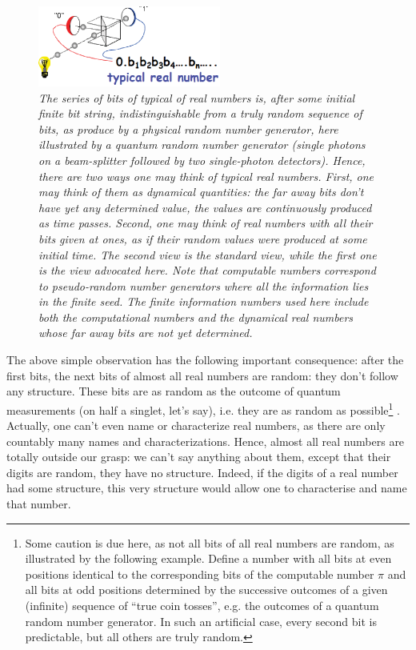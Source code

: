 \documentclass[pra,aps,groupedaddress,twocolumn,floatfix,nofootinbib]{revtex4}
\begin{document}
\begin{figure}[h]
\includegraphics[width=6cm]{TypicalRealNumber.eps}
\caption{\it The series of bits of typical of real numbers is, after some initial finite bit string, indistinguishable from a truly random sequence of bits, as produce by a physical random number generator, here illustrated by a quantum random number generator (single photons on a beam-splitter followed by two single-photon detectors). Hence, there are two ways one may think of typical real numbers. First, one may think of them as dynamical quantities: the far away bits don't have yet any determined value, the values are continuously produced as time passes. Second, one may think of real numbers with all their bits given at ones, as if their random values were produced at some initial time. The second view is the standard view, while the first one is the view advocated here. Note that computable numbers correspond to pseudo-random number generators where all the information lies in the finite seed. The finite information numbers used here include both the computational numbers and the dynamical real numbers whose far away bits are not yet determined.}
\end{figure} 

The above simple observation has the following important consequence: after the first bits, the next bits of almost all real numbers are random: they don't follow any structure. These bits are as random as the outcome of quantum measurements (on half a singlet, let's say), i.e. they are as random as possible\footnote{Some caution is due here, as not all bits of all real numbers are random, as illustrated by the following example. Define a number with all bits at even positions identical to the corresponding bits of the computable number $\pi$ and all bits at odd positions determined by the successive outcomes of a given (infinite) sequence of ``true coin tosses'', e.g. the outcomes of a quantum random number generator. In such an artificial case, every second bit is predictable, but all others are truly random.\label{randomPi}} \cite{Chaitin}. Actually, one can't even name or characterize real numbers, as there are only countably many names and characterizations. Hence, almost all real numbers are totally outside our grasp: we can't say anything about them, except that their digits are random, they have no structure. Indeed, if the digits of a real number had some structure, this very structure would allow one to characterise and name that number.
\end{document}
